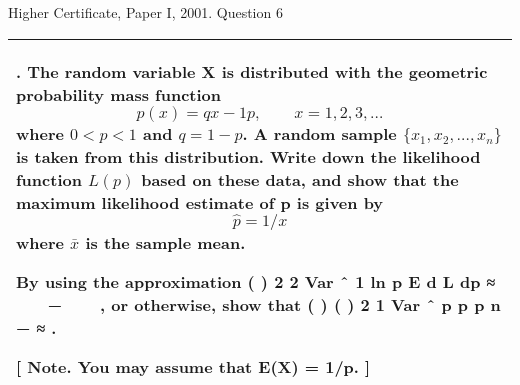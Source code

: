 \documentclass[a4paper,12pt]{article}
\begin{document}
Higher Certificate, Paper I, 2001. Question 6
\begin{table}[ht!]
     \centering
     \begin{tabular}{|p{15cm}|}
     \hline        
\noindent 6. The random variable X is distributed with the geometric probability mass function
\[p(x) = qx−1 p ,\qquad x = 1, 2, 3, \ldots\]
where $0 < p < 1$ and $q = 1 − p$. A random sample $\{x_1, x_2, \ldots, x_n\}$ is taken from this
distribution.
Write down the likelihood function $L(p)$ based on these data, and show that the
maximum likelihood estimate of p is given by
\[\hat{p} =1/ x\]
where $\bar{x}$ is the sample mean.

By using the approximation
( ) 2
2
Var ˆ 1
ln
p
E d L
dp
≈
 
 − 
 
,
or otherwise, show that
( ) ( ) 2 1
Var ˆ
p p
p
n
−
≈ .

[ Note. You may assume that E(X) = 1/p. ]

\\ \hline
      \end{tabular}
    \end{table}
\end{document}
